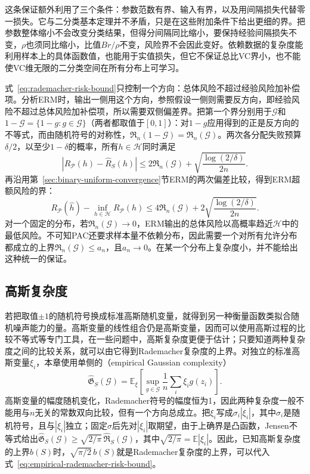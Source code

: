 这条保证额外利用了三个条件：参数范数有界、输入有界，以及用间隔损失代替零一损失。它与二分类基本定理并不矛盾，只是在这些附加条件下给出更细的界。把参数整体缩小不会改变分类结果，但得分间隔同比缩小，要保持经验间隔损失不变，$\rho$也须同比缩小，比值$Br/\rho$不变，风险界不会因此变好。依赖数据的复杂度能利用样本上的具体函数值，也能用于实值损失，但它不保证总比VC界小，也不能使VC维无限的二分类空间在所有分布上可学习。

式~\eqref{eq:rademacher-risk-bound}只控制一个方向：总体风险不超过经验风险加补偿项。分析ERM时，输出一侧用这个方向，参照假设一侧则需要反方向，即经验风险不超过总体风险加补偿项，所以需要双侧偏差界。把第一个界分别用于$\mathcal G$和$1-\mathcal G=\{1-g:g\in\mathcal G\}$（两者都取值于$[0,1]$）：对$1-g$应用得到的正是反方向的不等式，而由随机符号的对称性，$\mathfrak R_n(1-\mathcal G)=\mathfrak R_n(\mathcal G)$。两次各分配失败预算$\delta/2$，以至少$1-\delta$的概率，所有$h\in\mathcal H$同时满足
\[
 |R_{\mathcal P}(h)-\hat R_S(h)|
 \leq2\mathfrak R_n(\mathcal G)+\sqrt{\frac{\log(2/\delta)}{2n}}.
\]
再沿用第~\ref{sec:binary-uniform-convergence}节ERM的两次偏差比较，得到ERM超额风险的界：
\begin{equation}
 R_{\mathcal P}(\hat h)-\inf_{h\in\mathcal H}R_{\mathcal P}(h)
 \leq4\mathfrak R_n(\mathcal G)
 +2\sqrt{\frac{\log(2/\delta)}{2n}}.
 \label{eq:rademacher-excess-risk}
\end{equation}
对一个固定的分布，若$\mathfrak R_n(\mathcal G)\to0$，ERM输出的总体风险以高概率趋近$\mathcal H$中的最低风险。不可知PAC还要求样本量不依赖分布，因此需要一个对所有允许分布都成立的上界$\mathfrak R_n(\mathcal G)\leq a_n$，且$a_n\to0$。在某一个分布上复杂度小，并不能给出这种统一的保证。

\subsection{高斯复杂度}

若把取值$\pm1$的随机符号换成标准高斯随机变量，就得到另一种衡量函数类拟合随机噪声能力的量。高斯变量的线性组合仍是高斯变量，因而可以使用高斯过程的比较不等式等专门工具，在一些问题中，高斯复杂度更便于估计；只要知道两种复杂度之间的比较关系，就可以由它得到Rademacher复杂度的上界。对独立的标准高斯变量$\xi_i$，本章使用单侧的（empirical Gaussian complexity）
\[
 \widehat{\mathfrak G}_S(\mathcal G)
 =\mathbb E_\xi\left[\sup_{g\in\mathcal G}\frac1n\sum_i \xi_i g(z_i)\right].
\]
高斯变量的幅度随机变化，Rademacher符号的幅度恒为1，因此两种复杂度一般不能用与$n$无关的常数双向比较，但有一个方向总成立。把$\xi_i$写成$\sigma_i|\xi_i|$，其中$\sigma_i$是随机符号，且与$|\xi_i|$独立；固定$\sigma$后先对$|\xi_i|$取期望，由于上确界是凸函数，Jensen不等式给出$\widehat{\mathfrak G}_S(\mathcal G)\geq\sqrt{2/\pi}\,\widehat{\mathfrak R}_S(\mathcal G)$，其中$\sqrt{2/\pi}=\mathbb E|\xi_i|$。因此，已知高斯复杂度的上界$b(S)$时，$\sqrt{\pi/2}\,b(S)$就是Rademacher复杂度的上界，可以代入式~\eqref{eq:empirical-rademacher-risk-bound}。

